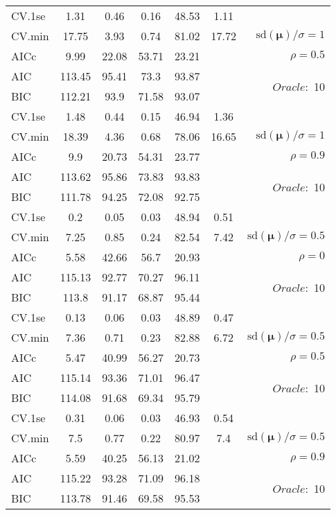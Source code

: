 \begin{table}
\begin{center}
\begin{tabular}{l*{5}{c}|r}
 \hline 
CV.1se & 1.31 & 0.46 & 0.16 & 48.53 & 1.11 & \\
CV.min & 17.75 & 3.93 & 0.74 & 81.02 & 17.72 &  $\mathrm{sd}(\mathbf{\mu})/\sigma=1$ \\
AICc & 9.99 & 22.08 & 53.71 & 23.21 & & $\rho=0.5$ \\
AIC & 113.45 & 95.41 & 73.3 & 93.87 & &  \multirow{2}{*}{$Oracle: $ 10} \\
BIC & 112.21 & 93.9 & 71.58 & 93.07 & &  \\
 \hline 
CV.1se & 1.48 & 0.44 & 0.15 & 46.94 & 1.36 & \\
CV.min & 18.39 & 4.36 & 0.68 & 78.06 & 16.65 &  $\mathrm{sd}(\mathbf{\mu})/\sigma=1$ \\
AICc & 9.9 & 20.73 & 54.31 & 23.77 & & $\rho=0.9$ \\
AIC & 113.62 & 95.86 & 73.83 & 93.83 & &  \multirow{2}{*}{$Oracle: $ 10} \\
BIC & 111.78 & 94.25 & 72.08 & 92.75 & &  \\
 \hline 
CV.1se & 0.2 & 0.05 & 0.03 & 48.94 & 0.51 & \\
CV.min & 7.25 & 0.85 & 0.24 & 82.54 & 7.42 &  $\mathrm{sd}(\mathbf{\mu})/\sigma=0.5$ \\
AICc & 5.58 & 42.66 & 56.7 & 20.93 & & $\rho=0$ \\
AIC & 115.13 & 92.77 & 70.27 & 96.11 & &  \multirow{2}{*}{$Oracle: $ 10} \\
BIC & 113.8 & 91.17 & 68.87 & 95.44 & &  \\
 \hline 
CV.1se & 0.13 & 0.06 & 0.03 & 48.89 & 0.47 & \\
CV.min & 7.36 & 0.71 & 0.23 & 82.88 & 6.72 &  $\mathrm{sd}(\mathbf{\mu})/\sigma=0.5$ \\
AICc & 5.47 & 40.99 & 56.27 & 20.73 & & $\rho=0.5$ \\
AIC & 115.14 & 93.36 & 71.01 & 96.47 & &  \multirow{2}{*}{$Oracle: $ 10} \\
BIC & 114.08 & 91.68 & 69.34 & 95.79 & &  \\
 \hline 
CV.1se & 0.31 & 0.06 & 0.03 & 46.93 & 0.54 & \\
CV.min & 7.5 & 0.77 & 0.22 & 80.97 & 7.4 &  $\mathrm{sd}(\mathbf{\mu})/\sigma=0.5$ \\
AICc & 5.59 & 40.25 & 56.13 & 21.02 & & $\rho=0.9$ \\
AIC & 115.22 & 93.28 & 71.09 & 96.18 & &  \multirow{2}{*}{$Oracle: $ 10} \\
BIC & 113.78 & 91.46 & 69.58 & 95.53 & &  \\
 \hline 
\end{tabular}
\end{center}
\vspace{-1cm}
\end{table}






